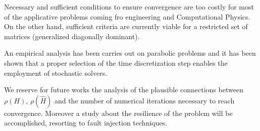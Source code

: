 \documentclass[a4paper,10pt]{article}
\begin{document}
Necessary and sufficient conditions to ensure convergence are too costly for
most of the applicative problems coming fro engineering and Computational
Physics. On the other hand, sufficient criteria are currently viable for a
restricted set of matrices (generalized diagonally dominant).

An empirical analysis has been carries out on parabolic problems and it has
been shown that a proper selection of the time discretization step enables the
employment of stochastic solvers.

We reserve for future works the analysis of the plausible connections between
$\rho(H)$, $\rho(\hat{H})$ and the number of numerical iterations necessary to
reach convergence. Moreover a study about the resilience of the problem will be
accomplished, resorting to fault injection techniques.



\end{document}
